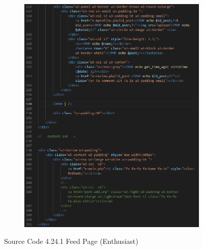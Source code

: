 \begin{enumerate}[1.]
\begin{figure}[h]
\begin{subfigure}[b]{0.6\textwidth}
            \label{fig:sub1}
        \end{subfigure}
        \hspace{0.04\textwidth}
        \begin{subfigure}[b]{0.6\textwidth}
            \centering
            \includegraphics[width=\textwidth]{mainmatter/images/frontend/code/efeed2.png}
            \label{fig:sub2}
        \end{subfigure}
        \caption*{Source Code 4.24.1 Feed Page (Enthusiast)}
        \label{fig:myfig63a}
    \end{figure}
    \clearpage


\end{enumerate}
